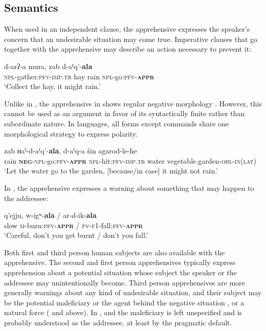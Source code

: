 \documentclass[output=paper,colorlinks,citecolor=brown]{langscibook}
\begin{document}
\subsection{Semantics}
\label{subsec:Msem}
 
When used in an independent clause, the apprehensive expresses the speaker's concern that an undesirable situation may come true. Imperative clauses that go together with the apprehensive may describe an action necessary to prevent it:
 

\ea \label{ex:DD34}
\gll d-arʔ-a mura, zab d-aˤq'-\textbf{ala} \\
\textsc{npl}-gather:\textsc{pfv-imp.tr} hay rain \textsc{npl}-go:\textsc{pfv-\textbf{appr}} \\
\glt `Collect the hay, it might rain.'
\z

 Unlike in , the apprehensive in  shows regular negative morphology . However, this cannot be used as an argument in favor of its syntactically finite rather than subordinate nature. In  languages, all forms except commands share one morphological strategy to express polarity.
 
\ea \label{ex:DD35}
\gll zab {ʜaˤ}-d-aˤq'-\textbf{ala}, d-aˤq-a šin agarod-le-ħe \\
rain \textsc{\textbf{neg}-npl-}go:\textsc{pfv-\textbf{appr}} \textsc{npl}-hit:\textsc{pfv-imp.tr} water vegetable.garden-\textsc{obl-in(lat)} \\
\glt `Let the water go to the garden, [because/in case] it might not rain.'
\z


 In , the apprehensive expresses a warning about something that may happen to the addressee:
 
\ea \label{ex:DD36}
\gll q'ejju, w-igʷ-\textbf{ala} \textnormal{/} ar-d-ik-\textbf{ala} \\
slow \textsc{m}-burn:\textsc{pfv-\textbf{appr}} / \textsc{pv-f1}-fall:\textsc{pfv-\textbf{appr}} \\
\glt `Careful, don't you get burnt / don't you fall.'
\z


 Both first and third person human subjects are also available with the apprehensive. The second and first person apprehensives typically express apprehension about a potential situation whose subject the speaker  or the addressee  may unintentionally become. Third person apprehensives are more generally warnings about any kind of undesirable situation, and their subject may be the potential maleficiary  or the agent behind the negative situation , or a natural force ( and  above). In ,  and  the maleficiary is left unspecified and is probably understood as the addressee, at least by the pragmatic default.
\end{document}

